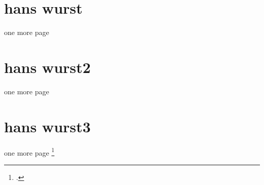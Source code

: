 \section{hans wurst}
one more page

\section{hans wurst2}
one more page

\section{hans wurst3}
one more page \footcites(Vgl.)(){braun:scala,fab:vorlage}

